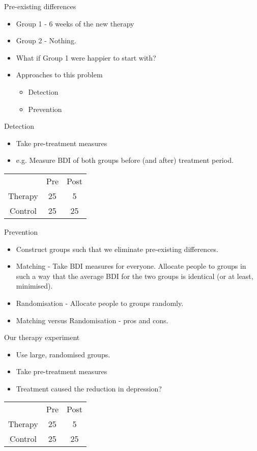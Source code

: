 \documentclass{beamer}
\begin{document}
\begin{frame}{Pre-existing differences}
\begin{itemize}
\item Group 1 - 6 weeks of the new therapy
\item Group 2 - Nothing.
\vspace{12 pt}
\item What if Group 1 were happier to start with?
\vspace{12 pt}
\item Approaches to this problem
\begin{itemize}
\item Detection
\item Prevention
\end{itemize}
\end{itemize}
\end{frame}

\begin{frame}{Detection}
\begin{itemize}
\item Take pre-treatment measures
\item e.g. Measure BDI of both groups before (and after) treatment period.
\end{itemize}
\begin{tabular} {c c c}
			&	Pre	 &	Post \\
Therapy	&	25	&		5 \\
Control	&	25	&		25 \\
\end{tabular} 
\end{frame}

\begin{frame}{Prevention}
\begin{itemize}
\item Construct groups such that we eliminate pre-existing differences.
\item Matching - Take BDI measures for everyone. Allocate people to groups in such a way that the average BDI for the two groups is identical (or at least, minimised).
\item Randomisation - Allocate people to groups randomly.
\item Matching versus Randomisation - pros and cons.
\end{itemize}
\end{frame}

\begin{frame}{Our therapy experiment}
\begin{itemize}
\item Use large, randomised groups.
\item Take pre-treatment measures
\item Treatment caused the reduction in depression?
\end{itemize}
\vspace{12 pt}
\begin{tabular} {c c c}
			&	Pre	 &	Post \\
Therapy	&	25	&		5 \\
Control	&	25	&		25 \\
\end{tabular} 
\end{frame}
\end{document}
